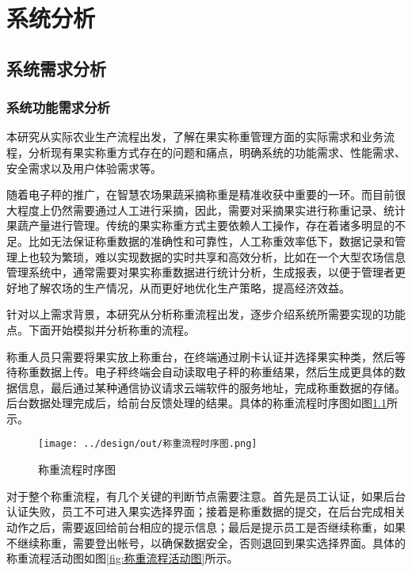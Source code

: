 \chapter{系统分析}

\section{系统需求分析}

\subsection{系统功能需求分析}

本研究从实际农业生产流程出发，了解在果实称重管理方面的实际需求和业务流程，分析现有果实称重方式存在的问题和痛点，明确系统的功能需求、性能需求、安全需求以及用户体验需求等。

随着电子秤的推广，在智慧农场果蔬采摘称重是精准收获中重要的一环。而目前很大程度上仍然需要通过人工进行采摘，因此，需要对采摘果实进行称重记录、统计果蔬产量进行管理。传统的果实称重方式主要依赖人工操作，存在着诸多明显的不足。比如无法保证称重数据的准确性和可靠性，人工称重效率低下，数据记录和管理上也较为繁琐，难以实现数据的实时共享和高效分析，比如在一个大型农场信息管理系统中，通常需要对果实称重数据进行统计分析，生成报表，以便于管理者更好地了解农场的生产情况，从而更好地优化生产策略，提高经济效益。

针对以上需求背景，本研究从分析称重流程出发，逐步介绍系统所需要实现的功能点。下面开始模拟并分析称重的流程。

称重人员只需要将果实放上称重台，在终端通过刷卡认证并选择果实种类，然后等待称重数据上传。电子秤终端会自动读取电子秤的称重结果，然后生成更具体的数据信息，最后通过某种通信协议请求云端软件的服务地址，完成称重数据的存储。后台数据处理完成后，给前台反馈处理的结果。具体的称重流程时序图如图\ref{fig:称重流程时序图}所示。

\begin{figure}[H]
    \centering
    \texttt{[image: ../design/out/称重流程时序图.png]}
    \caption{称重流程时序图}
    \label{fig:称重流程时序图}
\end{figure}

对于整个称重流程，有几个关键的判断节点需要注意。首先是员工认证，如果后台认证失败，员工不可进入果实选择界面；接着是称重数据的提交，在后台完成相关动作之后，需要返回给前台相应的提示信息；最后是提示员工是否继续称重，如果不继续称重，需要登出帐号，以确保数据安全，否则退回到果实选择界面。具体的称重流程活动图如图\ref{fig:称重流程活动图}所示。

